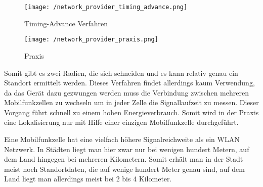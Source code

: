 \begin{figure}[H]
\centering
\texttt{[image: /network\_provider\_timing\_advance.png]}
\caption[Lokalisierung: Timing-Advance Verfahren]{Timing-Advance Verfahren}
\label{fig:networkProviderTimingAdvance}
\end{figure}


\begin{wrapfigure}{r}{43mm}
\centering
   \texttt{[image: /network\_provider\_praxis.png]} 
   \vspace{-5mm}
   \caption[Lokalisierung: NETWORK Provider in der Praxis]{Praxis}
   \vspace{-5mm}
\end{wrapfigure}
Somit gibt es zwei Radien, die sich schneiden und es kann relativ genau ein Standort ermittelt werden. 
Dieses Verfahren findet allerdings kaum Verwendung, da das Gerät dazu gezwungen werden muss die Verbindung zwischen  mehreren Mobilfunkzellen zu wechseln um in jeder Zelle die Signallaufzeit zu messen. Dieser Vorgang führt schnell zu einem hohen Energieverbrauch. Somit wird in der Praxis eine Lokalisierung nur mit Hilfe einer einzigen Mobilfunkzelle durchgeführt. 

Eine Mobilfunkzelle hat eine vielfach höhere Signalreichweite als ein WLAN Netzwerk. In Städten liegt man hier zwar nur bei wenigen hundert Metern, auf dem Land hingegen bei mehreren Kilometern. Somit erhält man in der Stadt meist noch Standortdaten, die auf wenige hundert Meter genau sind, auf dem Land liegt man allerdings meist bei 2 bis 4 Kilometer.


